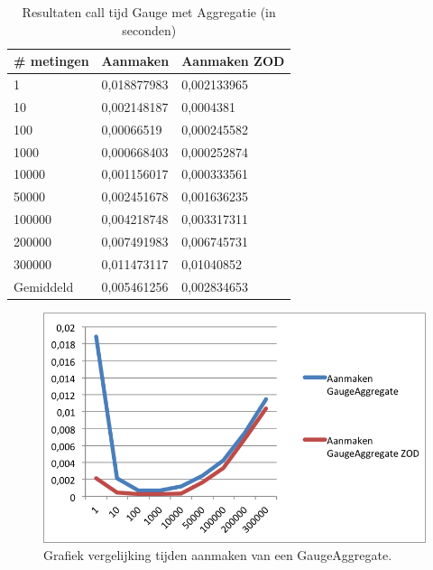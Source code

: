 \clearpage
\begin{table}[]
\centering
\begin{tabular}{|l|l|l|}
\hline
\# metingen & Aanmaken    & Aanmaken ZOD \\ \hline
1           & 0,018877983 & 0,002133965  \\ \hline
10          & 0,002148187 & 0,0004381    \\ \hline
100         & 0,00066519  & 0,000245582  \\ \hline
1000        & 0,000668403 & 0,000252874  \\ \hline
10000       & 0,001156017 & 0,000333561  \\ \hline
50000       & 0,002451678 & 0,001636235  \\ \hline
100000      & 0,004218748 & 0,003317311  \\ \hline
200000      & 0,007491983 & 0,006745731  \\ \hline
300000      & 0,011473117 & 0,01040852   \\ \hline
Gemiddeld   & 0,005461256 & 0,002834653  \\ \hline
\end{tabular}
\caption{Resultaten call tijd Gauge met Aggregatie (in seconden)}
\label{Table:GaugeAggregate}
\end{table}
\begin{figure}[!h]
  \centering
  \includegraphics[scale=1.0]{Afbeeldingen/Evaluatie/AanmakenGaugeAggregate}
  \caption{Grafiek vergelijking tijden aanmaken van een GaugeAggregate.}
  \label{fig:GraphGaugeAggregate}
\end{figure}



